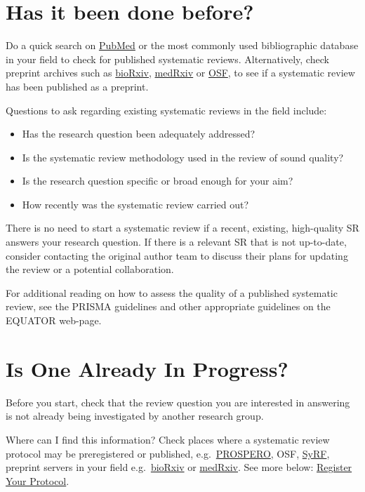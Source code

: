 \documentclass[
]{book}
\providecommand{\tightlist}{%
  \setlength{\itemsep}{0pt}\setlength{\parskip}{0pt}}
\begin{document}
\hypertarget{has-it-been-done-before}{%
\section{Has it been done before?}\label{has-it-been-done-before}}

Do a quick search on \href{https://pubmed.ncbi.nlm.nih.gov/}{PubMed} or the most commonly used bibliographic database in your field to check for published systematic reviews. Alternatively, check preprint archives such as \href{https://www.biorxiv.org/}{bioRxiv}, \href{https://www.medrxiv.org/}{medRxiv} or \href{https://osf.io/}{OSF}, to see if a systematic review has been published as a preprint.

Questions to ask regarding existing systematic reviews in the field include:

\begin{itemize}
\tightlist
\item
  Has the research question been adequately addressed?
\item
  Is the systematic review methodology used in the review of sound quality?
\item
  Is the research question specific or broad enough for your aim?
\item
  How recently was the systematic review carried out?
\end{itemize}

There is no need to start a systematic review if a recent, existing, high-quality SR answers your research question. If there is a relevant SR that is not up-to-date, consider contacting the original author team to discuss their plans for updating the review or a potential collaboration.

For additional reading on how to assess the quality of a published systematic review, see the PRISMA guidelines and other appropriate guidelines on the EQUATOR web-page.

\hypertarget{is-one-already-in-progress}{%
\section{Is One Already In Progress?}\label{is-one-already-in-progress}}

Before you start, check that the review question you are interested in answering is not already being investigated by another research group.

Where can I find this information?
Check places where a systematic review protocol may be preregistered or published, e.g.~\href{https://www.crd.york.ac.uk/prospero/}{PROSPERO}, OSF, \href{http://syrf.org.uk/}{SyRF}, preprint servers in your field e.g.~\href{https://www.biorxiv.org/}{bioRxiv} or \href{https://www.medrxiv.org/}{medRxiv}. See more below: \protect\hyperlink{register-your-protocol}{Register Your Protocol}.
\end{document}
